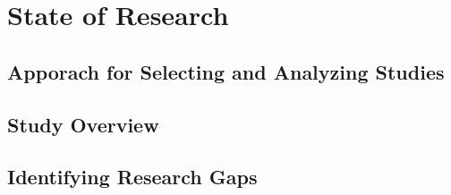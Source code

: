 
\chapter{State of Research}

\section{Apporach for Selecting and Analyzing Studies}

\section{Study Overview}

\section{Identifying Research Gaps}
